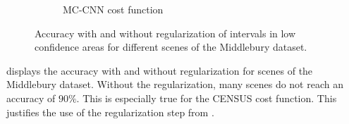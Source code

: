 \begin{figure}
\begin{subfigure}[t]{0.5\linewidth}
        \caption{MC-CNN cost function}
        \label{fig:acc_no_reg_MCCNN}
    \end{subfigure}
    \caption{Accuracy with and without regularization of intervals in low confidence areas for different scenes of the Middlebury dataset.}
    \label{fig:acc_reg_no_reg}
\end{figure}

 displays the accuracy with and without regularization for scenes of the Middlebury dataset. Without the regularization, many scenes do not reach an accuracy of $90\%$. This is especially true for the CENSUS cost function. This justifies the use of the regularization step from .

\clearpage